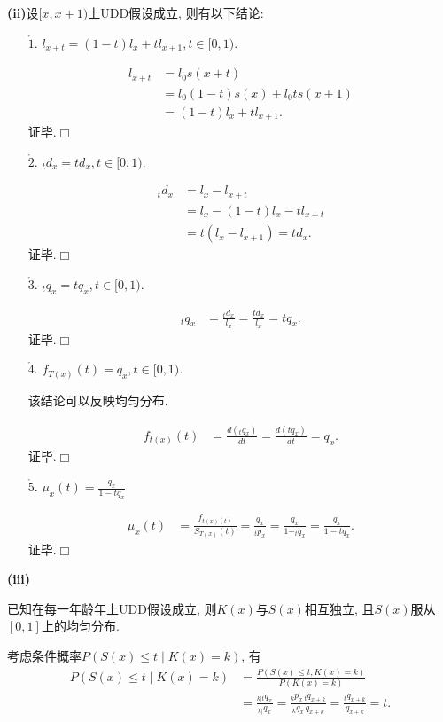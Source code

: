 \documentclass[a4paper,10pt]{ctexbook}
\def\qed{\hfill$\Box$\medskip}
\begin{document}
{\rm\bf(ii)}设$[x,x+1)$上UDD假设成立, 则有以下结论:
\begin{enumerate}
    \item[$\mathring 1.$] $l_{x+t}=(1-t)l_{x}+tl_{x+1},t\in [0,1).$

        \proof \begin{align*}
            l_{x+t} & =l_{0}s(x+t)                 \\
                    & =l_{0}(1-t)s(x)+l_{0}ts(x+1) \\
                    & =(1-t)l_{x}+tl_{x+1}.
        \end{align*}
        证毕.\qed
    \item[$\mathring 2.$] $_{t}d_{x}=td_{x},t\in [0,1).$

        \proof \begin{align*}
            _{t}d_{x} & =l_{x}-l_{x+t}             \\
                      & =l_x-(1-t)l_{x}-tl_{x+t}   \\
                      & =t(l_{x}-l_{x+1}) =td_{x}.
        \end{align*}
        证毕.\qed
    \item[$\mathring 3.$] $_{t}q_{x}=tq_{x},t\in [0,1).$

        \proof \begin{align*}
            _{t}q_{x} & =\frac{_{t}d_{x}}{l_{x}} =\frac{td_{x}}{l_{x}}  = tq_{x}.
        \end{align*}
        证毕.\qed
    \item[$\mathring 4.$] $f_{T(x)}(t)=q_{x},t\in [0,1).$

        该结论可以反映均匀分布.

        \proof \begin{align*}
            f_{t(x)}(t) & =\frac{d(_{t}q_{x})}{dt} =\frac{d(tq_{x})}{dt} =q_x.
        \end{align*}
        证毕.\qed
    \item [$\mathring 5.$] $\mu_{x}(t)=\frac{q_{x}}{1-tq_x}$

          \proof \begin{align*}
              \mu_{x}(t) & =\frac{f_{t(x)(t)}}{S_{T(x)}(t)} =\frac{q_{x}}{_{t}p_{x}} =\frac{q_{x}}{1-_{t}q_{x}} =\frac{q_{x}}{1-tq_{x}}.
          \end{align*}
          证毕.\qed
\end{enumerate}

{\rm\bf(iii)}  \begin{proposition}已知在每一年龄年上UDD假设成立, 则$K(x)$与$S(x)$相互独立, 且$S(x)$服从$[0,1]$上的均匀分布.
\end{proposition}
\proof
考虑条件概率$P(S(x) \leq t \mid K(x) = k)$, 有
\begin{align*}
    P(S(x) \leq t \mid K(x) = k) & = \frac{P(S(x) \leq t, K(x) = k)}{P(K(x) = k)}                                                                          \\
                                 & = \frac{_{k|t}q_{x}}{_{k|}q_{x}} = \frac{_{k}p_{x}\,_{t}q_{x+k}}{_{k}q_{x}\,q_{x+k}} = \frac{_{t}q_{x+k}}{q_{x+k}} = t.
\end{align*}
\end{document}
